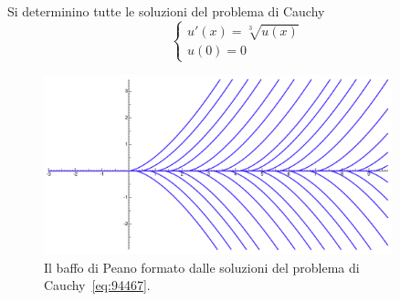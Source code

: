 \begin{example}
Si determinino tutte le soluzioni del problema di Cauchy
\begin{equation}
\label{eq:94467}
\begin{cases}
  u'(x) = \sqrt[3]{u(x)}\\
  u(0)=0
\end{cases}
\end{equation}
\end{example}
%
\newsavebox{\qrnovequattro}
\begin{figure}
\centering
\includegraphics[width=0.9\textwidth]{fig_94467.pdf}
\caption{Il baffo di Peano formato dalle soluzioni del problema di Cauchy~\eqref{eq:94467}.\\\\
\usebox{\qrnovequattro}}
\label{fig:94467}
\end{figure}
%
